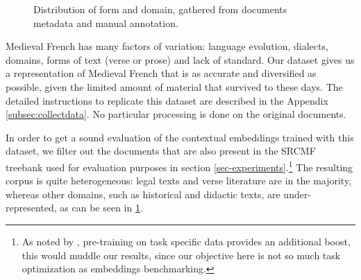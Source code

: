 \begin{figure}[thb]
    \centering
    \caption{Distribution of form and domain, gathered from documents metadata and manual annotation.}
    \label{fig:metadata}
\end{figure}

Medieval French has many factors of variation: language evolution, dialects, domains, forms of text (verse or prose) and lack of standard. Our dataset gives us a representation of Medieval French that is as accurate and diversified as possible, given the limited amount of material that survived to these days.
The detailed instructions to replicate this dataset are described in the Appendix \ref{subsec:collectdata}. No particular processing is done on the original documents.

In order to get a sound evaluation of the contextual embeddings trained with this dataset, we filter out the documents that are also present in the SRCMF treebank used for evaluation purposes in section \ref{sec-experiments}.\footnote{As noted by \citet{gururangan-etal-2020-dont}, pre-training on task specific data provides an additional boost, this would muddle our results, since our objective here is not so much task optimization as embeddings benchmarking.} The resulting corpus is quite heterogeneous: legal texts and verse literature are in the majority, whereas other domains, such as historical and didactic texts, are under-represented, as can be seen in \cref{fig:metadata}.


